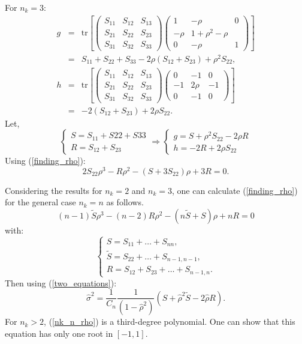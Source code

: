 \documentclass[11pt,a5paper,twoside]{book}
\begin{document}
{For $n_k=3$:
\[
\begin{aligned}
g&=&\mathrm{tr}\left[ \begin{pmatrix}
S_{11} & S_{12} & S_{13} \\
S_{21} & S_{22} & S_{23}\\
S_{31} & S_{32} & S_{33}
\end{pmatrix}\begin{pmatrix}
1 & -\rho & 0\\
-\rho & 1+\rho^2 -\rho\\
0 & -\rho & 1
\end{pmatrix} \right ] \\ &=&S_{11}+S_{22}+S_{33} -2\rho (S_{12} +S_{23})  + \rho^2 S_{22},\\
h&=&\mathrm{tr}\left[ \begin{pmatrix}
S_{11} & S_{12} & S_{13} \\
S_{21} & S_{22} & S_{23}\\
S_{31} & S_{32} & S_{33}
\end{pmatrix}\begin{pmatrix}
0 & -1 &0 \\
-1 & 2\rho & -1\\
0 & -1 & 0
\end{pmatrix} \right ]\\ &=& -2 (S_{12} +S_{23}) + 2 \rho S_{22}.
\end{aligned}
\]
Let,
\begin{equation*}
\begin{cases}
S=S_{11}+S{22}+S{33}\\
R=S_{12}+S_{23}
\end{cases} \Rightarrow \begin{cases}
g=S+\rho^2 S_{22} - 2\rho R\\
h=-2R + 2\rho S_{22}
\end{cases}
\end{equation*}
Using (\ref{finding_rho}):
\begin{equation}
\label{n3}
2S_{22}\rho^3 - R\rho^2 - (S+3 S_{22})\rho + 3R =0.
\end{equation}

Considering the results for $n_k=2$ and $n_k=3$, one can calculate (\ref{finding_rho}) for the general case $n_k=n$ as follows.
\begin{equation}
\label{nk_n_rho}
(n-1) \tilde{S} \rho^3 - (n-2) R \rho^2 - (n\tilde{S}+S)\rho + nR=0
\end{equation}
with:
\begin{equation*}
\begin{cases}
S=S_{11}+\ldots+S_{nn},\\
\tilde{S}=S_{22}+\ldots+S_{n-1,n-1},\\
R=S_{12}+S_{23}+\ldots+S_{n-1,n}.
\end{cases}
\end{equation*}
Then using (\ref{two_equations}):
\begin{equation}
\label{nk_n_sigma2}
\widehat{\sigma}^2=\frac{1}{C_n}\frac{1}{(1-\widehat{\rho}^2)} (S+\widehat{\rho}^2 \tilde{S} - 2\widehat{\rho} R).
\end{equation}
For $n_k>2$,  (\ref{nk_n_rho}) is a third-degree polynomial. One can show that  this equation has only one root in $[-1,1]$.

}
\end{document}
